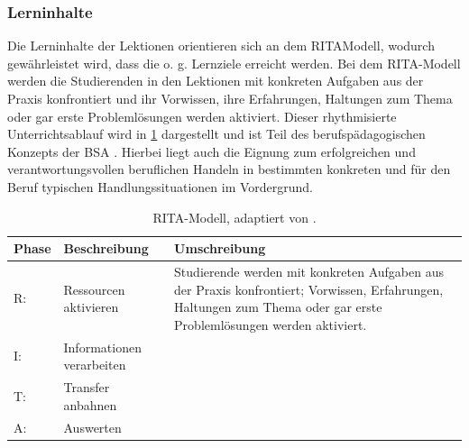 \documentclass[
11pt,
captions=tableheading,
smallheadings,
headsepline,
footsepline, 
parskip=half-,
]{scrartcl}
\begin{document}
\subsubsection{Lerninhalte}
Die Lerninhalte der Lektionen orientieren sich an dem RITA­Modell, wodurch gewährleistet wird, dass die o. g. Lernziele erreicht werden. Bei dem RITA-Modell werden die Studierenden in den Lektionen mit konkreten Aufgaben aus der Praxis konfrontiert und ihr Vorwissen, ihre Erfahrungen, Haltungen zum Thema oder gar erste Problemlösungen werden aktiviert. Dieser rhythmisierte Unterrichtsablauf wird in \cref{tab:RITA_Modell} dargestellt und ist Teil des berufspädagogischen Konzepts der BSA \cite{BerufspädagogischesKonzept_BauschuleAarau}. Hierbei liegt auch die Eignung zum erfolgreichen und verantwortungsvollen beruflichen Handeln in bestimmten konkreten und für den Beruf typischen Handlungssituationen \cite{BerufspädagogischesKonzept_BauschuleAarau} im Vordergrund.


\begin{table}[H]
    \centering
    \label{tab:RITA_Modell}
    \caption{RITA-Modell, adaptiert von \cite{BerufspädagogischesKonzept_BauschuleAarau}.}
    \begin{tabularx}{\textwidth}{@{}llp{9.5cm}@{}}
        \toprule
        \textbf{Phase} & \textbf{Beschreibung}     & \textbf{Umschreibung}                                                                                                                                               \\
        \midrule
        R:             & Ressourcen aktivieren     & Studierende werden mit konkreten Aufgaben aus der Praxis konfrontiert; Vorwissen, Erfahrungen, Haltungen zum Thema oder gar erste Problemlösungen werden aktiviert. \\
        I:             & Informationen verarbeiten & {}                                                                                                                                                                  \\
        T:             & Transfer anbahnen         & {}                                                                                                                                                                  \\
        A:             & Auswerten                 & {}                                                                                                                                                                  \\
        \bottomrule
    \end{tabularx}
\end{table}
\end{document}
